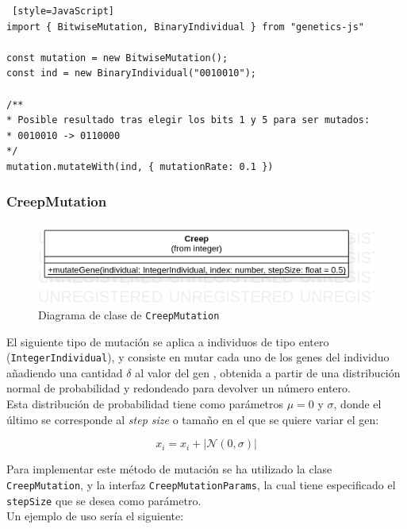 \begin{lstlisting} [style=JavaScript]
import { BitwiseMutation, BinaryIndividual } from "genetics-js"

const mutation = new BitwiseMutation();
const ind = new BinaryIndividual("0010010");

/**
* Posible resultado tras elegir los bits 1 y 5 para ser mutados:
* 0010010 -> 0110000
*/
mutation.mutateWith(ind, { mutationRate: 0.1 })
\end{lstlisting}

\subsubsection{CreepMutation}

\begin{figure}[ht]
    \centering
    \includegraphics[scale=0.5]{mem/images/cap-4/4.2.7(Mutation)/CreepMutatioon.png}
    \caption{Diagrama de clase de \texttt{CreepMutation}}
    \label{fig:my_label}
\end{figure}

El siguiente tipo de mutación se aplica a individuos de tipo entero (\texttt{IntegerIndividual}), y consiste en mutar cada uno de los genes del individuo añadiendo una cantidad $\delta$ al valor del gen \cite{davis1991handbook}, obtenida a partir de una distribución normal de probabilidad y redondeado para devolver un número entero. \\

Esta distribución de probabilidad tiene como parámetros $\mu = 0$ y $\sigma$, donde el último se corresponde al \textit{step size} o tamaño en el que se quiere variar el gen:

\begin{equation}
    x_i = x_i + |\mathcal{N}(0, \sigma)|
\end{equation}

Para implementar este método de mutación se ha utilizado la clase \texttt{CreepMutation}, y la interfaz \texttt{CreepMutationParams}, la cual tiene especificado el \texttt{stepSize} que se desea como parámetro. \\

Un ejemplo de uso sería el siguiente:

